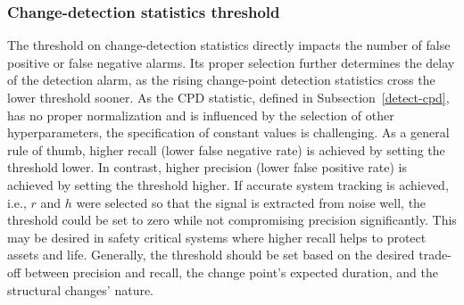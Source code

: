 \subsubsection{Change-detection statistics threshold}
The threshold on change-detection statistics directly impacts the number of false positive or false negative alarms. Its proper selection further determines the delay of the detection alarm, as the rising change-point detection statistics cross the lower threshold sooner. As the CPD statistic, defined in Subsection~\ref{detect-cpd}, has no proper normalization and is influenced by the selection of other hyperparameters, the specification of constant values is challenging. As a general rule of thumb, higher recall (lower false negative rate) is achieved by setting the threshold lower. In contrast, higher precision (lower false positive rate) is achieved by setting the threshold higher. If accurate system tracking is achieved, i.e., \( r \) and \(h\) were selected so that the signal is extracted from noise well, the threshold could be set to zero while not compromising precision significantly. This may be desired in safety critical systems where higher recall helps to protect assets and life.  Generally, the threshold should be set based on the desired trade-off between precision and recall, the change point's expected duration, and the structural changes' nature.
